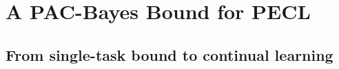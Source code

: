\documentclass{article}
\theoremstyle{plain}
\theoremstyle{definition}
\theoremstyle{remark}
\begin{document}




\section{A PAC-Bayes Bound for PECL}
\label{sec:pac-pecl}


\subsection{From single-task bound to continual learning}
\end{document}
